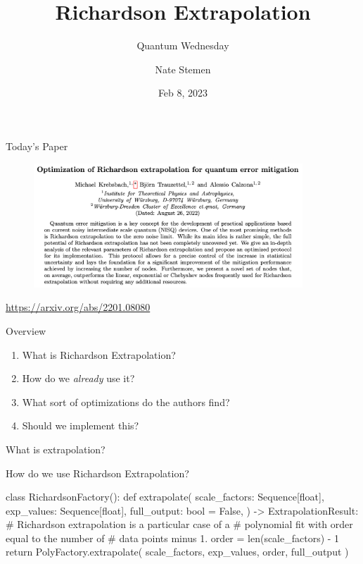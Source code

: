 \documentclass[11pt,aspectratio=1610,xcolor=dvipsnames]{beamer}
\title{Richardson Extrapolation}
\subtitle{Quantum Wednesday}
\date{Feb 8, 2023}
\author{Nate Stemen}
\begin{document}
\maketitle

\begin{frame}{Today's Paper}
	\begin{figure}[h]
		\centering
		\includegraphics[width=0.9\textwidth]{abstract.png}
	\end{figure}
	\begin{center}
		\url{https://arxiv.org/abs/2201.08080}
	\end{center}
\end{frame}

\begin{frame}{Overview}
	\begin{enumerate}
		\item What is Richardson Extrapolation?
		\item How do we \emph{already} use it?
		\item What sort of optimizations do the authors find?
		\item Should we implement this?
	\end{enumerate}
\end{frame}

\begin{frame}{What is extrapolation?}

\end{frame}

\begin{frame}[fragile]{How do we use Richardson Extrapolation?}
	\begin{python}
		class RichardsonFactory():
			def extrapolate(
				scale_factors: Sequence[float],
				exp_values: Sequence[float],
				full_output: bool = False,
			) -> ExtrapolationResult:
				# Richardson extrapolation is a particular case of a
				# polynomial fit with order equal to the number of
				# data points minus 1.
				order = len(scale_factors) - 1
				return PolyFactory.extrapolate(
					scale_factors, exp_values, order, full_output
				)
	\end{python}
\end{frame}
\end{document}
